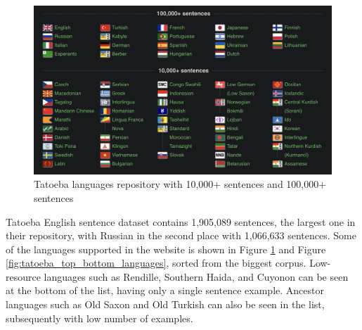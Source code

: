 \documentclass[a4paper]{article}
\begin{document}
\begin{figure}[htbp]
    \centering
    \includegraphics[width=0.9\linewidth]{images/tatoeba_languages.png}
    \caption{Tatoeba languages repository with 10,000+ sentences and 100,000+ sentences \cite{tatoeba}}
    \label{fig:tatoeba_languages}
\end{figure}

Tatoeba English sentence dataset contains 1,905,089 sentences, the largest one in their repository, with Russian in the second place with 1,066,633 sentences. Some of the languages supported in the website is shown in Figure \ref{fig:tatoeba_languages} and Figure \ref{fig:tatoeba_top_bottom_languages}, sorted from the biggest corpus. Low-resource languages such as Rendille, Southern Haida, and Cuyonon can be seen at the bottom of the list, having only a single sentence example. Ancestor languages such as Old Saxon and Old Turkish can also be seen in the list, subsequently with low number of examples.
\end{document}
